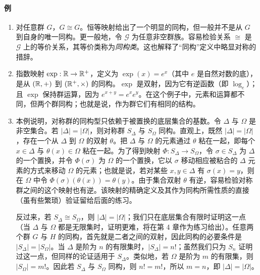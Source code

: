 \paragraph{例}
\begin{enumerate}[label=(\arabic*)]
  \item 对任意群 $G$，$G\cong G$。恒等映射给出了一个明显的同构，但一般并不是从 $G$ 到自身的唯一同构。更一般地，令 $\mathcal{G}$ 为任意非空群族。容易检验关系 $\cong$ 是 $\mathcal{G}$ 上的等价关系，其等价类称为\emph{同构类}。这也解释了“同构”定义中略显对称的措辞。
  \item 指数映射 $\exp:\mathbb{R}\to\mathbb{R}^+$，定义为 $\exp(x)=e^x$（其中 $e$ 是自然对数的底），是从 $(\mathbb{R},+)$ 到 $(\mathbb{R}^+,\times)$ 的同构。$\exp$ 是双射，因为它有逆函数（即 $\log_e$）；且 $\exp$ 保持群运算，因为 $e^{x+y}=e^xe^y$。在这个例子中，元素和运算都不同，但两个群同构；也就是说，作为群它们有相同的结构。
  \item 本例说明，对称群的同构型只依赖于被置换的底层集合的基数。令 $\Delta$ 与 $\Omega$ 是非空集合。若 $|\Delta|=|\Omega|$，则对称群 $S_\Delta$ 与 $S_\Omega$ 同构。直观上，既然 $|\Delta|=|\Omega|$，存在一个从 $\Delta$ 到 $\Omega$ 的双射 $\theta$。把 $\Delta$ 与 $\Omega$ 的元素通过 $\theta$ 粘在一起，即每个 $x\in\Delta$ 与 $\theta(x)\in\Omega$ 粘在一起。为了得到映射 $\Phi:S_\Delta\to S_\Omega$，令 $\sigma\in S_\Delta$ 为 $\Delta$ 的一个置换，并令 $\Phi(\sigma)$ 为 $\Omega$ 的一个置换，它以 $\sigma$ 移动相应被粘合的 $\Delta$ 元素的方式来移动 $\Omega$ 的元素；也就是说，若对某些 $x,y\in\Delta$ 有 $\sigma(x)=y$，则在 $\Omega$ 中令 $\Phi(\sigma)(\theta(x))=\theta(y)$。由于集合双射 $\theta$ 有逆，容易检验对称群之间的这个映射也有逆。该映射的精确定义及其作为同构所需性质的直接（虽有些繁琐）验证留给后面的练习。

  反过来，若 $S_\Delta\cong S_\Omega$，则 $|\Delta|=|\Omega|$；我们只在底层集合有限时证明这一点（当 $\Delta$ 与 $\Omega$ 都是无限集时，证明更难，将在第 4 章作为练习给出）。任意两个群 $G$ 与 $H$ 的同构，首先就是二者之间的双射，因此同构的必要条件是 $|S_\Delta|=|S_\Omega|$。当 $\Delta$ 是阶为 $n$ 的有限集时，$|S_\Delta|=n!$；虽然我们只为 $S_n$ 证明过这一点，但同样的论证适用于 $S_\Delta$。类似地，若 $\Omega$ 是阶为 $m$ 的有限集，则 $|S_\Omega|=m!$。因此若 $S_\Delta$ 与 $S_\Omega$ 同构，则 $n!=m!$，所以 $m=n$，即 $|\Delta|=|\Omega|$。
\end{enumerate}

